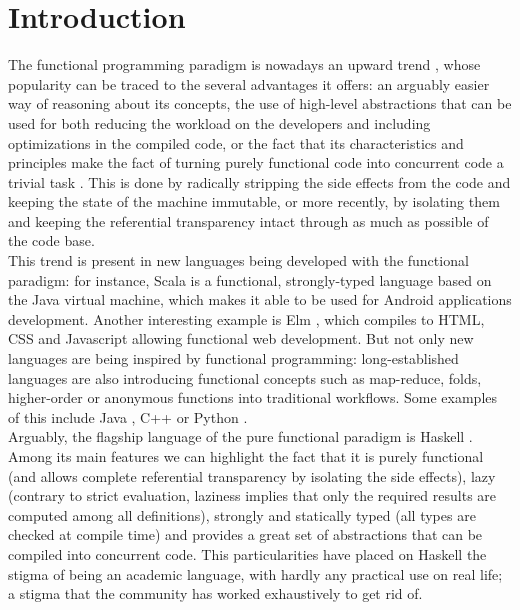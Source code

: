 \section{Introduction}

The functional programming paradigm is nowadays an upward trend
\cite{ford-2013-ibm}, whose popularity can be traced to the several advantages
it offers: an arguably easier way of reasoning about its concepts, the use of
high-level abstractions that can be used for both reducing the workload on the
developers and including optimizations in the compiled code, or the fact that
its characteristics and principles make the fact of turning purely functional
code into concurrent code a trivial task \cite{hammond-2012-parallel}. This is
done by radically stripping the side effects from the code and keeping the
state of the machine immutable, or more recently, by isolating them and keeping
the referential transparency intact through as much as possible of the code base.\\

This trend is present in new languages being developed with the functional
paradigm: for instance, Scala \cite{scala} is a functional, strongly-typed
language based on the Java virtual machine, which makes it able to be used for
Android applications development. Another interesting example is Elm
\cite{elm}, which compiles to HTML, CSS and Javascript allowing functional web
development. But not only new languages are being inspired by functional
programming: long-established languages are also introducing functional
concepts such as map-reduce, folds, higher-order or anonymous functions into
traditional workflows. Some examples of this include Java \cite{java8},
C++ \cite{cpp-lambdas, cpp-high-level} or Python \cite{python-mrs}.\\

Arguably, the flagship language of the pure functional paradigm is Haskell
\cite{haskell-98}. Among its main features we can highlight the fact that it is
purely functional (and allows complete referential transparency by isolating
the side effects), lazy (contrary to strict evaluation, laziness implies that
only the required results are computed among all definitions), strongly and
statically typed (all types are checked at compile time) and provides a great
set of abstractions that can be compiled into concurrent code. This
particularities have placed on Haskell the stigma of being an academic
language, with hardly any practical use on real life; a stigma that the
community has worked exhaustively to get rid of.\\

